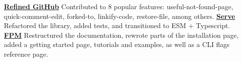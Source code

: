 \documentclass{resume}
\begin{document}
\begin{multicols}{2}
\begin{adjustwidth}{1em}{0em}
    \newline \newline
    \href{https://github.com/refined-github/refined-github/pulls?q=author%3Agamemaker1}{\textbf{Refined GitHub}}
    \newline Contributed to 8 popular features: useful-not-found-page, quick-comment-edit, forked-to, linkify-code, restore-file, among others.
    \newline \newline
    \href{https://github.com/vercel/serve/pulls?q=author%3Agamemaker1}{\textbf{Serve}}
    \newline Refactored the library, added tests, and transitioned to ESM + Typescript.
    \newline \newline
    \href{https://github.com/jordansissel/fpm/pulls?q=author%3Agamemaker1}{\textbf{FPM}}
    \newline Restructured the documentation, rewrote parts of the installation page, added a getting started page, tutorials and examples, as well as a CLI flags reference page.
    \end{adjustwidth}
\end{multicols}
\end{document}
